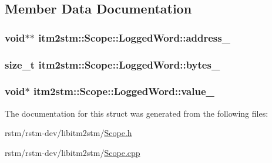 \subsection{Member Data Documentation}
\hypertarget{structitm2stm_1_1Scope_1_1LoggedWord_a2e34bed1d68bf7796977878e87746a3c}{
\subsubsection[{address\-\_\-}]{\setlength{\rightskip}{0pt plus 5cm}void$\ast$$\ast$ itm2stm\-::\-Scope\-::\-Logged\-Word\-::address\-\_\-\hspace{0.3cm}{\ttfamily [private]}}}\label{structitm2stm_1_1Scope_1_1LoggedWord_a2e34bed1d68bf7796977878e87746a3c}
\hypertarget{structitm2stm_1_1Scope_1_1LoggedWord_ac8f7885001bbcd034edc803d665a7bd1}{
\subsubsection[{bytes\-\_\-}]{\setlength{\rightskip}{0pt plus 5cm}size\-\_\-t itm2stm\-::\-Scope\-::\-Logged\-Word\-::bytes\-\_\-\hspace{0.3cm}{\ttfamily [private]}}}\label{structitm2stm_1_1Scope_1_1LoggedWord_ac8f7885001bbcd034edc803d665a7bd1}
\hypertarget{structitm2stm_1_1Scope_1_1LoggedWord_af683b956944064aeec6cd04c08916628}{
\subsubsection[{value\-\_\-}]{\setlength{\rightskip}{0pt plus 5cm}void$\ast$ itm2stm\-::\-Scope\-::\-Logged\-Word\-::value\-\_\-\hspace{0.3cm}{\ttfamily [private]}}}\label{structitm2stm_1_1Scope_1_1LoggedWord_af683b956944064aeec6cd04c08916628}


The documentation for this struct was generated from the following files\-:\begin{DoxyCompactItemize}
\item 
rstm/rstm-\/dev/libitm2stm/\hyperlink{Scope_8h}{Scope.\-h}\item 
rstm/rstm-\/dev/libitm2stm/\hyperlink{Scope_8cpp}{Scope.\-cpp}\end{DoxyCompactItemize}
